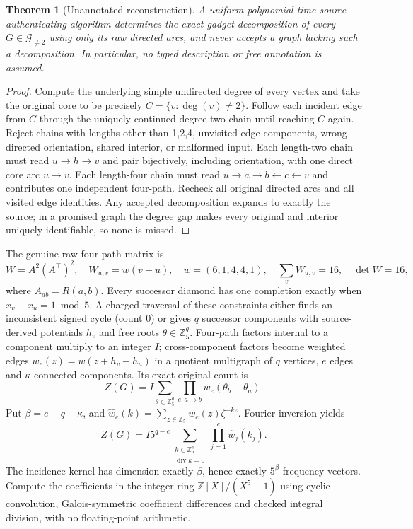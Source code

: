 \documentclass[11pt]{article}
\newtheorem{theorem}{Theorem}
\begin{document}
\begin{theorem}[Unannotated reconstruction]
A uniform polynomial-time source-authenticating algorithm determines the exact gadget decomposition of every $G\in\mathcal G_{\ne2}$ using only its raw directed arcs, and never accepts a graph lacking such a decomposition. In particular, no typed description or free annotation is assumed.
\end{theorem}
\begin{proof}
Compute the underlying simple undirected degree of every vertex and take the original core to be precisely $C=\{v:\deg(v)\ne2\}$. Follow each incident edge from $C$ through the uniquely continued degree-two chain until reaching $C$ again. Reject chains with lengths other than 1,2,4, unvisited edge components, wrong directed orientation, shared interior, or malformed input. Each length-two chain must read $u\to h\to v$ and pair bijectively, including orientation, with one direct core arc $u\to v$. Each length-four chain must read $u\to a\to b\leftarrow c\leftarrow v$ and contributes one independent four-path. Recheck all original directed arcs and all visited edge identities. Any accepted decomposition expands to exactly the source; in a promised graph the degree gap makes every original and interior uniquely identifiable, so none is missed.
\end{proof}
The genuine raw four-path matrix is
\[
 W=A^2(A^\top)^2,\quad W_{u,v}=w(v-u),\quad
 w=(6,1,4,4,1),\quad \sum_v W_{u,v}=16,\quad\det W=16,
\]
where $A_{ab}=R(a,b)$. Every successor diamond has one completion exactly when $x_v-x_u=1\bmod5$.
A charged traversal of these constraints either finds an inconsistent signed cycle (count 0) or gives $q$ successor components with source-derived potentials $h_v$ and free roots $\theta\in\mathbb Z_5^q$. Four-path factors internal to a component multiply to an integer $I$; cross-component factors become weighted edges
$w_e(z)=w(z+h_v-h_u)$ in a quotient multigraph of $q$ vertices, $e$ edges and $\kappa$ connected components. Its exact original count is
\[
 Z(G)=I\sum_{\theta\in\mathbb Z_5^q}
       \prod_{e:a\to b}w_e(\theta_b-\theta_a).
\]
Put $\beta=e-q+\kappa$, and
$\widehat w_e(k)=\sum_{z\in\mathbb Z_5}w_e(z)\zeta^{-kz}$.
Fourier inversion yields
\[
 \boxed{Z(G)= I5^{q-e}\sum_{\substack{k\in\mathbb Z_5^e\\
                              \operatorname{div}k=0}}
                      \prod_{j=1}^{e}\widehat w_j(k_j).}
\]
The incidence kernel has dimension exactly $\beta$, hence exactly $5^\beta$ frequency vectors. Compute the coefficients in the integer ring $\mathbb Z[X]/(X^5-1)$ using cyclic convolution, Galois-symmetric coefficient differences and checked integral division, with no floating-point arithmetic.
\end{document}
